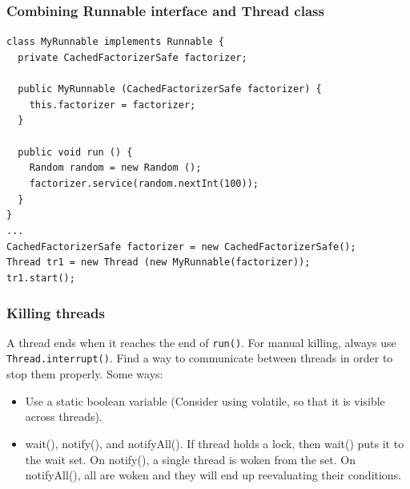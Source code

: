 \documentclass{article}
\begin{document}
\subsubsection{Combining Runnable interface and Thread class}
    \lstinline|class MyRunnable implements Runnable {|\\
    \lstinline|  private CachedFactorizerSafe factorizer;|\\\\
    \lstinline|  public MyRunnable (CachedFactorizerSafe factorizer) {|\\
    \lstinline|    this.factorizer = factorizer; |\\
    \lstinline|  }|\\\\
    \lstinline|  public void run () {|\\
    \lstinline|    Random random = new Random ();|\\
    \lstinline|    factorizer.service(random.nextInt(100));|\\
    \lstinline|  }|\\
    \lstinline|}|\\
    \lstinline|...|\\
    \lstinline|CachedFactorizerSafe factorizer = new CachedFactorizerSafe();|\\
    \lstinline|Thread tr1 = new Thread (new MyRunnable(factorizer));|\\
    \lstinline|tr1.start();|
    
\subsubsection{Killing threads}
A thread ends when it reaches the end of \lstinline{run()}. For manual killing, always use \lstinline{Thread.interrupt()}. Find a way to communicate between threads in order to stop them properly. Some ways:
\begin{itemize}
    \item Use a static boolean variable (Consider using volatile, so that it is visible across threads).
    \item wait(), notify(), and notifyAll(). If thread holds a lock, then wait() puts it to the wait set. On notify(), a single thread is woken from the set. On notifyAll(), all are woken and they will end up reevaluating their conditions.
\end{itemize}
\end{document}
